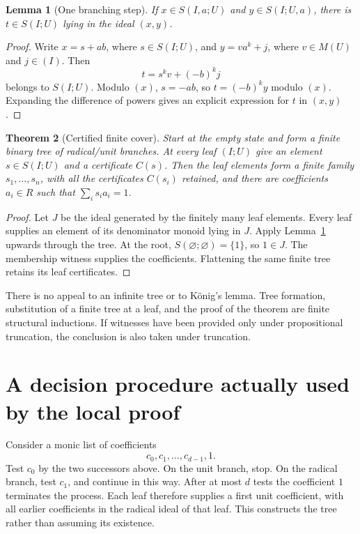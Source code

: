 \documentclass[11pt]{article}
\newtheorem{theorem}{Theorem}
\newtheorem{lemma}[theorem]{Lemma}
\begin{document}
\begin{lemma}[One branching step]\label{lem:branch}
If $x\in S(I,a;U)$ and $y\in S(I;U,a)$, there is
$t\in S(I;U)$ lying in the ideal $(x,y)$.
\end{lemma}
\begin{proof}
Write $x=s+ab$, where $s\in S(I;U)$, and
$y=va^k+j$, where $v\in M(U)$ and $j\in(I)$.
Then
\[
                 t=s^k v+(-b)^k j
\]
belongs to $S(I;U)$. Modulo $(x)$, $s=-ab$, so
$t=(-b)^k y$ modulo $(x)$. Expanding the difference of powers gives
an explicit expression for $t$ in $(x,y)$.
\end{proof}

\begin{theorem}[Certified finite cover]\label{thm:cover}
Start at the empty state and form a finite binary tree of radical/unit
branches. At every leaf $(I;U)$ give an element $s\in S(I;U)$ and a
certificate $C(s)$. Then the leaf elements form a finite family
$s_1,\ldots,s_n$, with all the certificates $C(s_i)$ retained, and there
are coefficients $a_i\in R$ such that $\sum_i s_i a_i=1$.
\end{theorem}
\begin{proof}
Let $J$ be the ideal generated by the finitely many leaf elements.
Every leaf supplies an element of its denominator monoid lying in $J$.
Apply Lemma~\ref{lem:branch} upwards through the tree. At the root,
$S(\varnothing;\varnothing)=\{1\}$, so $1\in J$.
The membership witness supplies the coefficients. Flattening the same
finite tree retains its leaf certificates.
\end{proof}

There is no appeal to an infinite tree or to K\"onig's lemma. Tree
formation, substitution of a finite tree at a leaf, and the proof of
the theorem are finite structural inductions. If witnesses have been
provided only under propositional truncation, the conclusion is also
taken under truncation.

\section{A decision procedure actually used by the local proof}

Consider a monic list of coefficients
\[
                       c_0,c_1,\ldots,c_{d-1},1.
\]
Test $c_0$ by the two successors above. On the unit branch, stop.
On the radical branch, test $c_1$, and continue in this way. After at
most $d$ tests the coefficient $1$ terminates the process. Each leaf
therefore supplies a first unit coefficient, with all earlier
coefficients in the radical ideal of that leaf. This constructs the
tree rather than assuming its existence.
\end{document}
